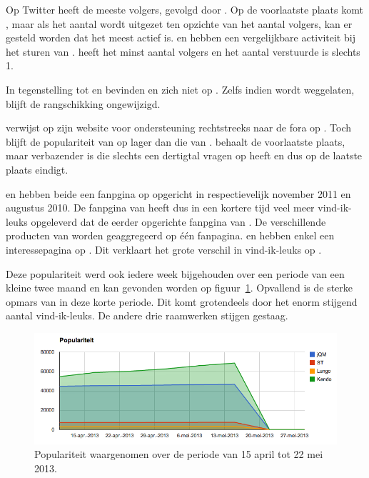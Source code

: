 Op Twitter heeft \jqm{} de meeste volgers, gevolgd door \kendo.
Op de voorlaatste plaats komt \lungo{}, maar als het aantal  wordt uitgezet ten opzichte van het aantal volgers, kan er gesteld worden dat \lungo{} het meest actief is.
\jqm{} en \kendo{} hebben een vergelijkbare activiteit bij het sturen van .
\st{} heeft het minst aantal volgers en het aantal verstuurde  is slechts 1.


In tegenstelling tot \jqm{} en \lungo{} bevinden \kendo{} en \st{} zich niet op \gh{}.
Zelfs indien \gh{} wordt weggelaten, blijft de rangschikking ongewijzigd.

\kendo{} verwijst op zijn website voor ondersteuning rechtstreeks naar de fora op \so{}. 
Toch blijft de populariteit van \kendo{} op \so{} lager dan die van \jqm{}.
\st{} behaalt de voorlaatste plaats, maar verbazender is \lungo{} die slechts een dertigtal vragen op \so{} heeft en dus op de laatste plaats eindigt.

\kendo{} en \jqm{} hebben beide een fanpgina op \fb{} opgericht in respectievelijk november 2011 en augustus 2010.
De fanpgina van \kendo{} heeft dus in een kortere tijd veel meer vind-ik-leuks opgeleverd dat de eerder opgerichte fanpgina van \jqm{}.
De verschillende producten van \kendo{} worden geaggregeerd op één fanpagina. 
\st{} en \lungo{} hebben enkel een interessepagina op \fb.
Dit verklaart het grote verschil in vind-ik-leuks op \fb.

Deze populariteit werd ook iedere week bijgehouden over een periode van een kleine twee maand en kan gevonden worden op figuur~\ref{fig:populariteit-evolutie}.
Opvallend is de sterke opmars van \kendo{} in deze korte periode.
Dit komt grotendeels door het enorm stijgend aantal \fb{} vind-ik-leuks.
De andere drie raamwerken stijgen gestaag.

\begin{figure}
  \centering
  \includegraphics[width=\textwidth]{figuren/populariteit.png}
  \caption{Populariteit waargenomen over de periode van 15 april tot 22 mei 2013.}
  \label{fig:populariteit-evolutie}
\end{figure}

